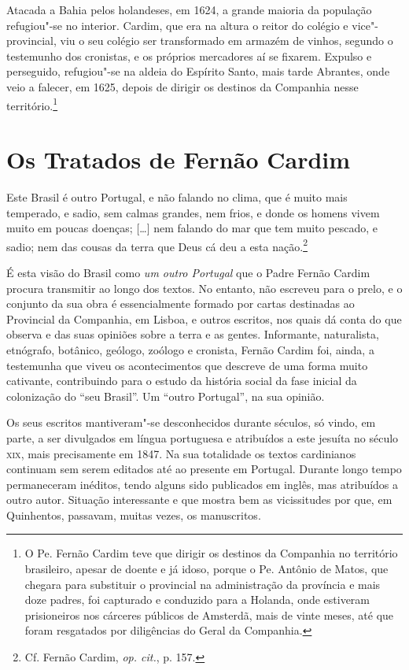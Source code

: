 Atacada a Bahia pelos holandeses, em 1624, a grande maioria da
população refugiou"-se no interior. Cardim, que era na altura o reitor
do colégio e vice"-provincial, viu o seu colégio ser transformado em
armazém de vinhos, segundo o testemunho dos cronistas, e os próprios
mercadores aí se fixarem. Expulso e perseguido, refugiou"-se na aldeia
do Espírito Santo, mais tarde Abrantes, onde veio a falecer, em 1625,
depois de dirigir os destinos da Companhia nesse território.\footnote{ O Pe. 
Fernão Cardim teve que dirigir os destinos da Companhia no
território brasileiro, apesar de doente e já idoso, porque o Pe. Antônio 
de Matos, que chegara para substituir o provincial na
administração da província e mais doze padres, foi capturado e
conduzido para a Holanda, onde estiveram prisioneiros nos cárceres
públicos de Amsterdã, mais de vinte meses, até que foram resgatados
por diligências do Geral da Companhia.} 

\section{Os Tratados de Fernão Cardim}

\begin{hedraquote}
Este Brasil é outro Portugal, e não falando no clima,
que é muito mais temperado, e sadio, sem calmas grandes, nem frios, e
donde os homens vivem muito em poucas doenças; [\ldots{}] nem falando do mar
que tem muito pescado, e sadio; nem das cousas da terra que Deus cá deu
a esta nação.\footnote{ Cf. Fernão Cardim, \textit{op. cit.}, p. 157.}
\end{hedraquote}

É esta visão do Brasil como \textit{um outro Portugal} que o Padre
Fernão Cardim procura transmitir ao longo dos textos. No entanto, não
escreveu para o prelo, e o conjunto da sua obra é essencialmente formado
por cartas destinadas ao Provincial da Companhia, em Lisboa, e outros
escritos, nos quais dá conta do que observa e das suas opiniões sobre a
terra e as gentes. Informante, naturalista, etnógrafo, botânico,
geólogo, zoólogo e cronista, Fernão Cardim foi, ainda, a testemunha que
viveu os acontecimentos que descreve de uma forma muito cativante,
contribuindo para o estudo da história social da fase inicial da
colonização do ``seu Brasil''. Um ``outro Portugal'', na sua opinião.

Os seus escritos mantiveram"-se desconhecidos durante séculos, só
vindo, em parte, a ser divulgados em língua portuguesa e atribuídos a
este jesuíta no século \textsc{xix}, mais precisamente em 1847. Na sua
totalidade os textos cardinianos continuam sem serem editados até ao
presente em Portugal. Durante longo tempo permaneceram inéditos, tendo
alguns sido publicados em inglês, mas atribuídos a outro autor.
Situação interessante e que mostra bem as vicissitudes por que, em
Quinhentos, passavam, muitas vezes, os manuscritos.

